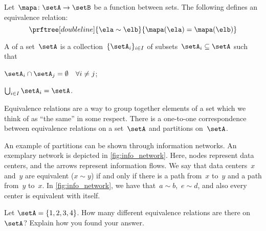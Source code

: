 \begin{example}
    Let~$\mapa\colon \setA\to \setB$ be a function between sets.
    The following defines an equivalence relation:
    \begin{equation*}
        \prftree[double line]{\ela\sim \elb}{\mapa(\ela)=\mapa(\elb)}
    \end{equation*}
\end{example}

\begin{definition}[Partition]
    \label{def:partition}
    A \emph{} of a set~$\setA$ is a collection~$\{\setA_i\}_{i\in I}$ of subsets~$\setA_i\subseteq \setA$ such that
    \begin{compactenum}
        \item $\setA_i\cap \setA_j=\emptyset \quad \forall i\neq j$;
        \item $\bigcup_{i\in I}\setA_i=\setA$.
    \end{compactenum}
\end{definition}

\begin{remark}
    Equivalence relations are a way to group together elements of a set which we think of as ``the same'' in some respect.
    There is a one-to-one correspondence between equivalence relations on a set~$\setA$ and partitions on~$\setA$.
\end{remark}


\begin{marginfigure}
    \centering
    \caption{
        \label{fig:info_network}
    }
\end{marginfigure}

\begin{example}
    An example of partitions can be shown through information networks.
    An exemplary network is depicted in \cref{fig:info_network}.
    Here, nodes represent data centers, and the arrows represent information flows.
    We say that data centers~$x$ and~$y$ are equivalent ($x\sim y$) if and only if there is a path from~$x$ to~$y$ and a path from~$y$ to~$x$.
    In \cref{fig:info_network}, we have that~$a\sim b$,~$e\sim d$, and also every center is equivalent with itself.
\end{example}




\begin{gradedexercise}
    \label{ex:CountingEquivalenceRelations}
    Let $\setA = \{ 1, 2, 3, 4 \}$.
    How many different equivalence relations are there on $\setA$?
    Explain how you found your answer.
\end{gradedexercise}



